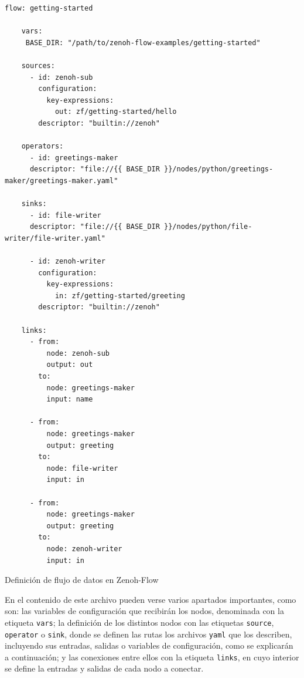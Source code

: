 \begin{code}[H]
  \begin{lstlisting}[style=yaml]
    flow: getting-started

    vars:
     BASE_DIR: "/path/to/zenoh-flow-examples/getting-started"
    
    sources:
      - id: zenoh-sub
        configuration:
          key-expressions:
            out: zf/getting-started/hello
        descriptor: "builtin://zenoh"
    
    operators:
      - id: greetings-maker
      descriptor: "file://{{ BASE_DIR }}/nodes/python/greetings-maker/greetings-maker.yaml"
    
    sinks:
      - id: file-writer
      descriptor: "file://{{ BASE_DIR }}/nodes/python/file-writer/file-writer.yaml"
    
      - id: zenoh-writer
        configuration:
          key-expressions:
            in: zf/getting-started/greeting
        descriptor: "builtin://zenoh"
    
    links:
      - from:
          node: zenoh-sub
          output: out
        to:
          node: greetings-maker
          input: name
    
      - from:
          node: greetings-maker
          output: greeting
        to:
          node: file-writer
          input: in
    
      - from:
          node: greetings-maker
          output: greeting
        to:
          node: zenoh-writer
          input: in
  \end{lstlisting}
\caption[Definición de flujo de datos en Zenoh-Flow]{Definición de flujo de datos en Zenoh-Flow}
\label{cod:data_flow_example}
\end{code}

En el contenido de este archivo pueden verse varios apartados importantes, como
son: las variables de configuración que recibirán los nodos, denominada con la
etiqueta \verb|vars|; la definición de los distintos nodos con las etiquetas
\verb|source|, \verb|operator| o \verb|sink|, donde se definen las rutas los
archivos \texttt{yaml} que los describen, incluyendo sus entradas, salidas o
variables de configuración, como se explicarán a continuación; y las conexiones
entre ellos con la etiqueta \verb|links|, en cuyo interior se define la entradas
y salidas de cada nodo a conectar.
\\


